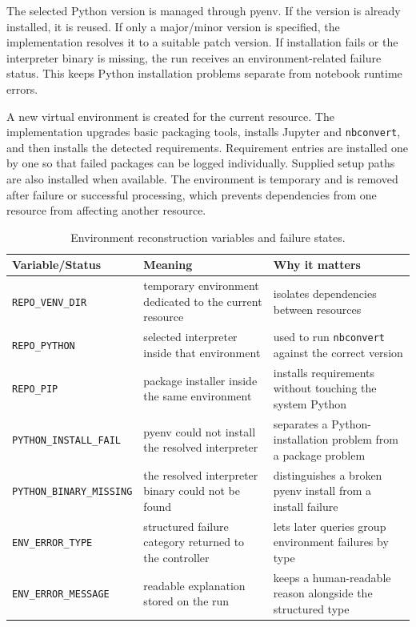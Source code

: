 The selected Python version is managed through pyenv. If the version is already installed, it is reused. If only a major/minor version is specified, the implementation resolves it to a suitable patch version. If installation fails or the interpreter binary is missing, the run receives an environment-related failure status. This keeps Python installation problems separate from notebook runtime errors.

A new virtual environment is created for the current resource. The implementation upgrades basic packaging tools, installs Jupyter and \texttt{nbconvert}, and then installs the detected requirements. Requirement entries are installed one by one so that failed packages can be logged individually. Supplied setup paths are also installed when available. The environment is temporary and is removed after failure or successful processing, which prevents dependencies from one resource from affecting another resource.

\begin{table}[ht]
\centering
\caption{Environment reconstruction variables and failure states.}
\label{tab:environment-state}
\small
\begin{tabularx}{\textwidth}{@{}p{3.2cm}p{4.6cm}X@{}}
\toprule
Variable/Status & Meaning & Why it matters\tabularnewline
\midrule
\texttt{REPO\_VENV\_DIR} & temporary environment dedicated to the current resource & isolates dependencies between resources\tabularnewline
\texttt{REPO\_PYTHON} & selected interpreter inside that environment & used to run \texttt{nbconvert} against the correct version\tabularnewline
\texttt{REPO\_PIP} & package installer inside the same environment & installs requirements without touching the system Python\tabularnewline
\texttt{PYTHON\_INSTALL\_}\linebreak\texttt{FAIL} & pyenv could not install the resolved interpreter & separates a Python-installation problem from a package problem\tabularnewline
\texttt{PYTHON\_BINARY\_}\linebreak\texttt{MISSING} & the resolved interpreter binary could not be found & distinguishes a broken pyenv install from a install failure\tabularnewline
\texttt{ENV\_ERROR\_TYPE} & structured failure category returned to the controller & lets later queries group environment failures by type\tabularnewline
\texttt{ENV\_ERROR\_}\linebreak\texttt{MESSAGE} & readable explanation stored on the run & keeps a human-readable reason alongside the structured type\tabularnewline
\bottomrule
\end{tabularx}
\end{table}

